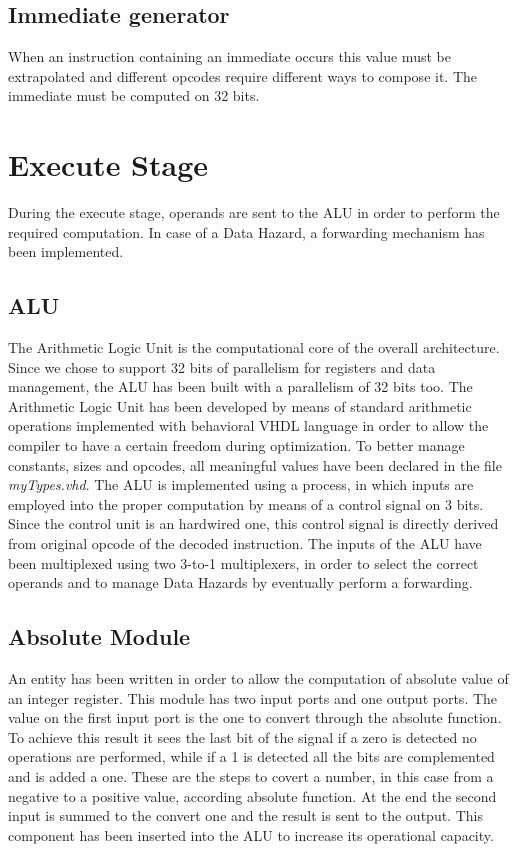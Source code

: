 \subsection{Immediate generator}

When an instruction containing an immediate occurs this value must be extrapolated and different opcodes require 
different ways to compose it. The immediate must be computed on 32 bits.

\section{Execute Stage}

During the execute stage, operands are sent to the ALU in order to perform the required computation. 
In case of a Data Hazard, a forwarding mechanism has been implemented.

\subsection{ALU}

The Arithmetic Logic Unit is the computational core of the overall architecture.
Since we chose to support 32 bits of parallelism for registers and data management, the ALU has been built with a parallelism of 32 bits too.
The Arithmetic Logic Unit has been developed by means of standard arithmetic operations implemented with behavioral VHDL language in order to allow the compiler 
to have a certain freedom during optimization.
To better manage constants, sizes and opcodes, all meaningful values have been declared in the file \textit{myTypes.vhd}.
The ALU is implemented using a process, in which inputs are employed into the proper computation by means of a control signal on 3 bits.
Since the control unit is an hardwired one, this control signal is directly derived from original opcode of the decoded instruction.
The inputs of the ALU have been multiplexed using two 3-to-1 multiplexers, in order to select the correct operands and to
manage Data Hazards by eventually perform a forwarding.

\subsection{Absolute Module}

An entity has been written in order to allow the computation of absolute value of an integer register.
This module has two input ports and one output ports. The value on the first input port is the one to convert 
through the absolute function. To achieve this result it sees the last bit of the signal if a zero is detected 
no operations are performed, while if a 1 is detected all the bits are complemented and is added a one. 
These are the steps to covert a number, in this case from a negative to a positive value, according absolute function.
At the end the second input is summed to the convert one and the result is sent to the output.
This component has been inserted into the ALU to increase its operational capacity.

